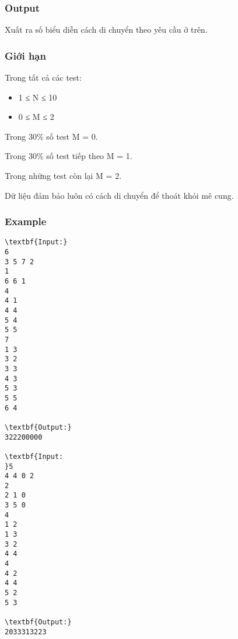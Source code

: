 \subsubsection{Output}

Xuất ra số biểu diễn cách di chuyển theo yêu cầu ở trên.

\subsubsection{Giới hạn}

Trong tất cả các test:
\begin{itemize}
	\item 1 ≤ N ≤ 10
	\item 0 ≤ M ≤ 2
\end{itemize}

Trong 30\% số test M = 0.

Trong 30\% số test tiếp theo M = 1.

Trong những test còn lại M = 2.

Dữ liệu đảm bảo luôn có cách di chuyển để thoát khỏi mê cung.

\subsubsection{Example}
\begin{verbatim}
\textbf{Input:}
6
3 5 7 2
1
6 6 1
4 
4 1
4 4
5 4
5 5
7
1 3
3 2
3 3
4 3
5 3
5 5
6 4

\textbf{Output:}
322200000
 
\textbf{Input:
}5
4 4 0 2
2
2 1 0
3 5 0
4
1 2
1 3
3 2
4 4
4
4 2
4 4
5 2
5 3

\textbf{Output:}
2033313223\end{verbatim}